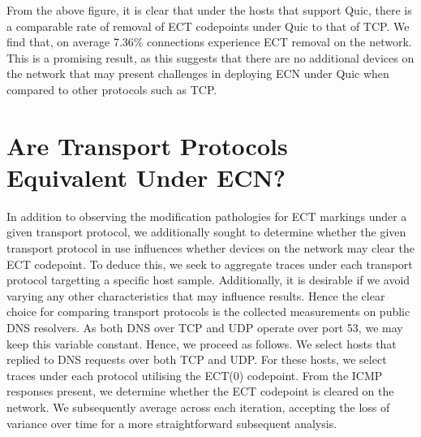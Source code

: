 \documentclass{l4proj}
\begin{document}
From the above figure, it is clear that under the hosts that support Quic, there is a comparable rate of removal of ECT codepoints under Quic to that of TCP. We find that, on average 7.36\% connections experience ECT removal on the network. This is a promising result, as this suggests that there are no additional devices on the network that may present challenges in deploying ECN under Quic when compared to other protocols such as TCP. 

\section{Are Transport Protocols Equivalent Under ECN?}

In addition to observing the modification pathologies for ECT markings under a given transport protocol, we additionally sought to determine whether the given transport protocol in use influences whether devices on the network may clear the ECT codepoint. To deduce this, we seek to aggregate traces under each transport protocol targetting a specific host sample. Additionally, it is desirable if we avoid varying any other characteristics that may influence results. Hence the clear choice for comparing transport protocols is the collected measurements on public DNS resolvers. As both DNS over TCP and UDP operate over port 53, we may keep this variable constant. Hence, we proceed as follows. We select hosts that replied to DNS requests over both TCP and UDP. For these hosts, we select traces under each protocol utilising the ECT(0) codepoint. From the ICMP responses present, we determine whether the ECT codepoint is cleared on the network. We subsequently average across each iteration, accepting the loss of variance over time for a more straightforward subsequent analysis.
\end{document}
